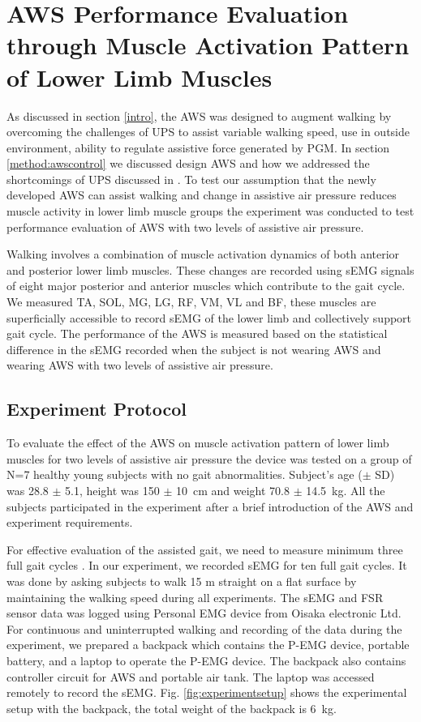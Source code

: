 \documentclass[letterpaper, 10 pt, conference]{ieeeconf}  %
\begin{document}
\section{AWS Performance Evaluation through Muscle Activation Pattern of Lower Limb Muscles} \label{Evaluation}

As discussed in section \ref{intro}, the AWS was designed to augment walking by overcoming the challenges of UPS to assist variable walking speed, use in outside environment, ability to regulate assistive force generated by PGM. In section \ref{method:awscontrol} we discussed design AWS and how we addressed the shortcomings of UPS discussed in \cite{14}. To test our assumption that the newly developed AWS can assist walking and change in assistive air pressure reduces muscle activity in lower limb muscle groups the experiment was conducted to test performance evaluation of AWS with two levels of assistive air pressure. 

Walking involves a combination of muscle activation dynamics of both anterior and posterior lower limb muscles. These changes are recorded using sEMG signals of eight major posterior and anterior muscles which contribute to the gait cycle. We measured TA, SOL, MG, LG, RF, VM, VL and BF, these muscles are superficially accessible to record sEMG of the lower limb and collectively support gait cycle. The performance of the AWS is measured based on the statistical difference in the sEMG recorded when the subject is not wearing AWS and wearing AWS with two levels of assistive air pressure.

\subsection{Experiment Protocol}
To evaluate the effect of the AWS on muscle activation pattern of lower limb muscles for two levels of assistive air pressure the device was tested on a group of N=7 healthy young subjects with no gait abnormalities. Subject’s age ($\pm$ SD) was 28.8 $\pm$ 5.1, height was 150 $\pm$ \SI{10}{\centi\meter} and weight 70.8 $\pm$ \SI{14.5}{\kilogram}. All the subjects participated in the experiment after a brief introduction of the AWS and experiment requirements.

For effective evaluation of the assisted gait, we need to measure minimum three full gait cycles \cite{17}. In our experiment, we recorded sEMG for ten full gait cycles. It was done by asking subjects to walk 15 m straight on a flat surface by maintaining the walking speed during all experiments. The sEMG and FSR sensor data was logged using Personal EMG device from Oisaka electronic Ltd. For continuous and uninterrupted walking and recording of the data during the experiment, we prepared a backpack which contains the P-EMG device, portable battery, and a laptop to operate the P-EMG device. The backpack also contains controller circuit for AWS and portable air tank. The laptop was accessed remotely to record the sEMG. Fig. \ref{fig:experimentsetup} shows the experimental setup with the backpack, the total weight of the backpack is \SI{6}{\kilogram}. 
\end{document}
